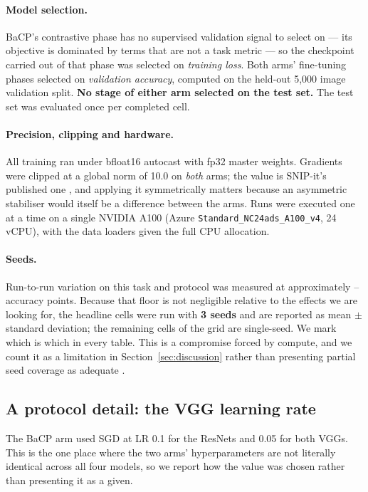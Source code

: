 \paragraph{Model selection.}
BaCP's contrastive phase has no supervised validation signal to select on --- its
objective is dominated by terms that are not a task metric --- so the checkpoint
carried out of that phase was selected on \emph{training loss}. Both arms'
fine-tuning phases selected on \emph{validation accuracy}, computed on the held-out
5{,}000 image validation split. \textbf{No stage of either arm selected on the
test set.} The test set was evaluated once per completed cell.

\paragraph{Precision, clipping and hardware.}
All training ran under bfloat16 autocast with fp32 master weights. Gradients were
clipped at a global norm of 10.0 on \emph{both} arms; the value is SNIP-it's
published one \citep{verdenius2020snipit}, and applying it symmetrically matters
because an asymmetric stabiliser would itself be a difference between the arms.
Runs were executed one at a time on a single NVIDIA A100 (Azure
\texttt{Standard\_NC24ads\_A100\_v4}, 24 vCPU), with the data loaders given the
full CPU allocation.

\paragraph{Seeds.}
Run-to-run variation on this task and protocol was measured at approximately
-- accuracy points.
Because that floor is not negligible relative to the effects we are looking for,
the headline cells were run with \textbf{3 seeds} and are reported as mean
$\pm$ standard deviation; the remaining cells of the grid are single-seed. We
mark which is which in every table. This is a compromise forced by compute, and
we count it as a limitation in Section~\ref{sec:discussion} rather than presenting
partial seed coverage as adequate \citep{bouthillier2021variance}.

\subsection{A protocol detail: the VGG learning rate}
\label{sec:experiments:vgglr}

The BaCP arm used SGD at LR 0.1 for the ResNets and 0.05 for both VGGs. This is
the one place where the two arms' hyperparameters are not literally identical
across all four models, so we report how the value was chosen rather than
presenting it as a given.

